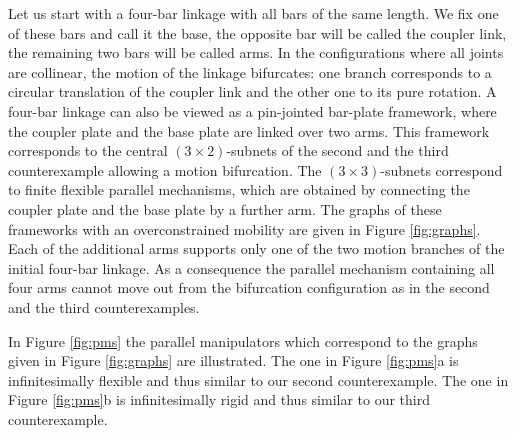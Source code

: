 \documentclass{amsart}
\theoremstyle{definition}
\begin{document}
Let us start with a four-bar linkage with all bars of the same length.
We fix one of these bars and call it the base, the opposite bar will be called the coupler link, the remaining two bars will be called arms.
In the configurations where all joints are collinear, the motion of the linkage bifurcates: one branch corresponds to a circular translation of the coupler link and the other one to its pure rotation.
A four-bar linkage can also be viewed as a pin-jointed bar-plate framework, where the coupler plate and the base plate are linked over two arms.
This framework corresponds to the central $(3\times 2)$-subnets of the second and the third counterexample allowing a motion bifurcation.
The $(3\times 3)$-subnets correspond to finite flexible parallel mechanisms, which are obtained by connecting the coupler plate and the base plate by a further arm.
The graphs of these frameworks with an overconstrained mobility are given in Figure \ref{fig:graphs}.
Each of the additional arms supports only one of the two motion branches of the initial four-bar linkage.
As a consequence the parallel mechanism containing all four arms cannot move out from the bifurcation configuration as in the second and the third counterexamples.

In Figure \ref{fig:pms} the parallel manipulators which correspond to the graphs given in Figure \ref{fig:graphs} are illustrated.
The one in Figure \ref{fig:pms}a is infinitesimally flexible and thus similar to our second counterexample.
The one in Figure \ref{fig:pms}b is infinitesimally rigid and thus similar to our third counterexample.
\end{document}
